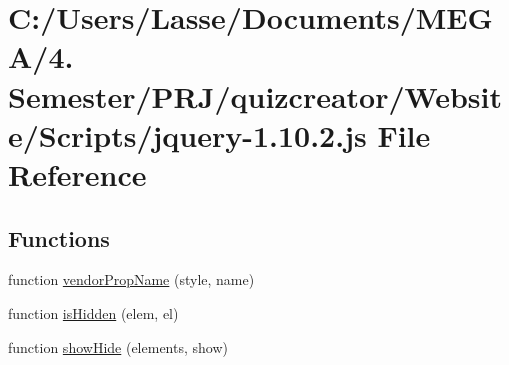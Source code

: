 \hypertarget{_scripts_2jquery-1_810_82_8js}{}\section{C\+:/\+Users/\+Lasse/\+Documents/\+M\+E\+G\+A/4. Semester/\+P\+R\+J/quizcreator/\+Website/\+Scripts/jquery-\/1.10.2.js File Reference}
\label{_scripts_2jquery-1_810_82_8js}
\subsection*{Functions}
\begin{DoxyCompactItemize}
\item 
function \hyperlink{_scripts_2jquery-1_810_82_8js_a6a111234d6e26ce833f8fabd50819b7a}{vendor\+Prop\+Name} (style, name)
\item 
function \hyperlink{_scripts_2jquery-1_810_82_8js_a67ed58d688ff11991ca2826ebfbf28a4}{is\+Hidden} (elem, el)
\item 
function \hyperlink{_scripts_2jquery-1_810_82_8js_a002b8e481f3ab2a83194366aceb7a706}{show\+Hide} (elements, show)
\item 

\end{DoxyCompactItemize}

